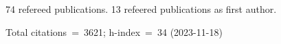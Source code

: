 74 refereed publications. 13 refeered publications as first author.

Total citations~=~3621; h-index~=~34 (2023-11-18)